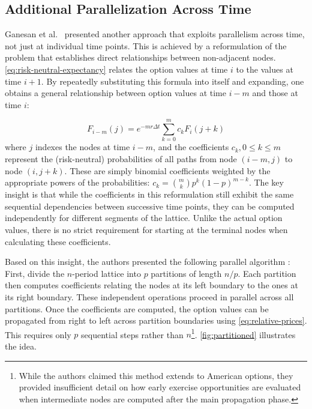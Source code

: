 \documentclass[english,12pt,a4paper,pdftex,sci,utf8]{aaltothesis}
\begin{document}
\subsection{Additional Parallelization Across Time}
Ganesan et al.\ \cite{ganesan2009acceleration} presented another approach that exploits parallelism across time, not just at individual time points. This is achieved by a reformulation of the problem that establishes direct relationships between non-adjacent nodes. \cref{eq:risk-neutral-expectancy} relates the option values at time $i$ to the values at time $i+1$. By repeatedly substituting this formula into itself and expanding, one obtains a general relationship between option values at time $i-m$ and those at time $i$:

\begin{equation}
    F_{i-m}(j) = e^{-m r \Delta t} \sum_{k=0}^m c_k F_i(j+k)
\label{eq:relative-prices}
\end{equation}
where $j$ indexes the nodes at time $i-m$, and the coefficients $c_k, 0 \leq k \leq m$ represent the (risk-neutral) probabilities of all paths from node $(i-m,j)$ to node $(i,j+k)$. These are simply binomial coefficients weighted by the appropriate powers of the probabilities: $c_k = \binom{m}{k}p^k(1-p)^{m-k}$. The key insight is that while the coefficients in this reformulation still exhibit the same sequential dependencies between successive time points, they can be computed independently for different segments of the lattice. Unlike the actual option values, there is no strict requirement for starting at the terminal nodes when calculating these coefficients.

Based on this insight, the authors presented the following parallel algorithm \cite{ganesan2009acceleration}: First, divide the $n$-period lattice into $p$ partitions of length $n/p$. Each partition then computes coefficients relating the nodes at its left boundary to the ones at its right boundary. These independent operations proceed in parallel across all partitions. Once the coefficients are computed, the option values can be propagated from right to left across partition boundaries using \cref{eq:relative-prices}. This requires only $p$ sequential steps rather than $n$\footnote{While the authors claimed this method extends to American options, they provided insufficient detail on how early exercise opportunities are evaluated when intermediate nodes are computed after the main propagation phase.}. \cref{fig:partitioned} illustrates the idea.
\end{document}
